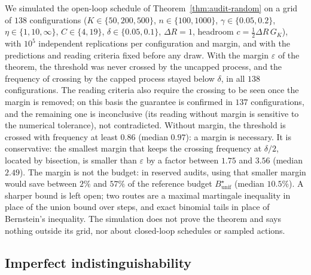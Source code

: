\begin{remark}\label{rem:audit-random-sim}
We simulated the open-loop schedule of Theorem~\ref{thm:audit-random} on a grid of $138$ configurations ($K\in\{50,200,500\}$, $n\in\{100,1000\}$, $\gamma\in\{0.05,0.2\}$, $\eta\in\{1,10,\infty\}$, $C\in\{4,19\}$, $\delta\in\{0.05,0.1\}$, $\Delta R=1$, headroom $c=\tfrac12\Delta R\,G_K$), with $10^5$ independent replications per configuration and margin, and with the predictions and reading criteria fixed before any draw. With the margin $\varepsilon$ of the theorem, the threshold was never crossed by the uncapped process, and the frequency of crossing by the capped process stayed below $\delta$, in all $138$ configurations. The reading criteria also require the crossing to be seen once the margin is removed; on this basis the guarantee is confirmed in $137$ configurations, and the remaining one is inconclusive (its reading without margin is sensitive to the numerical tolerance), not contradicted. Without margin, the threshold is crossed with frequency at least $0.86$ (median $0.97$): a margin is necessary. It is conservative: the smallest margin that keeps the crossing frequency at $\delta/2$, located by bisection, is smaller than $\varepsilon$ by a factor between $1.75$ and $3.56$ (median $2.49$). The margin is not the budget: in reserved audits, using that smaller margin would save between $2\%$ and $57\%$ of the reference budget $B^\star_{\mathrm{unif}}$ (median $10.5\%$). A sharper bound is left open; two routes are a maximal martingale inequality in place of the union bound over steps, and exact binomial tails in place of Bernstein's inequality. The simulation does not prove the theorem and says nothing outside its grid, nor about closed-loop schedules or sampled actions.
\end{remark}

\subsection{Imperfect indistinguishability}

